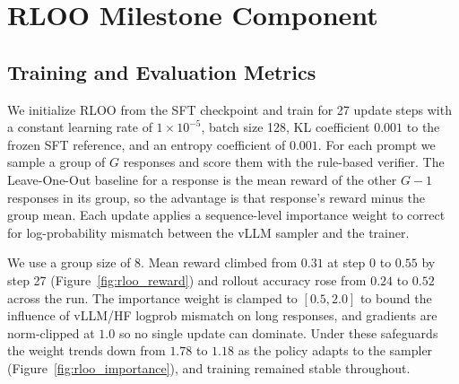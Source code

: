 \documentclass{article}
\begin{document}
\newpage

\section{RLOO Milestone Component}
\label{sec:rloo_milestone}

\subsection{Training and Evaluation Metrics}
We initialize RLOO from the SFT checkpoint and train for 27 update steps with a
constant learning rate of $1\times10^{-5}$, batch size 128, KL coefficient
$0.001$ to the frozen SFT reference, and an entropy coefficient of $0.001$. For each prompt we
sample a group of $G$ responses and score them with the rule-based verifier. The
Leave-One-Out baseline for a response is the mean reward of the other $G-1$
responses in its group, so the advantage is that response's reward minus the
group mean. Each update applies a sequence-level importance weight to correct for
log-probability mismatch between the vLLM sampler and the trainer.

We use a group size of 8. Mean reward climbed from $0.31$ at step 0 to $0.55$ by
step 27 (Figure~\ref{fig:rloo_reward}) and rollout accuracy rose from $0.24$ to
$0.52$ across the run. The importance weight is clamped to $[0.5, 2.0]$ to bound
the influence of vLLM/HF logprob mismatch on long responses, and gradients are
norm-clipped at $1.0$ so no single update can dominate. Under these safeguards the
weight trends down from $1.78$ to $1.18$ as the policy adapts to the sampler
(Figure~\ref{fig:rloo_importance}), and training remained stable throughout.
\end{document}
